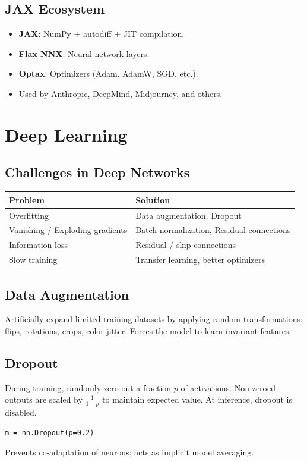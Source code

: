 \documentclass[11pt]{article}
\begin{document}
\subsection{JAX Ecosystem}
\begin{itemize}
  \item \textbf{JAX}: NumPy + autodiff + JIT compilation.
  \item \textbf{Flax NNX}: Neural network layers.
  \item \textbf{Optax}: Optimizers (Adam, AdamW, SGD, etc.).
  \item Used by Anthropic, DeepMind, Midjourney, and others.
\end{itemize}

\section{Deep Learning}

\subsection{Challenges in Deep Networks}
\begin{center}
\begin{tabular}{ll}
  \toprule
  Problem & Solution \\
  \midrule
  Overfitting & Data augmentation, Dropout \\
  Vanishing / Exploding gradients & Batch normalization, Residual connections \\
  Information loss & Residual / skip connections \\
  Slow training & Transfer learning, better optimizers \\
  \bottomrule
\end{tabular}
\end{center}

\subsection{Data Augmentation}
Artificially expand limited training datasets by applying random transformations: flips, rotations, crops, color jitter. Forces the model to learn invariant features.

\subsection{Dropout}
During training, randomly zero out a fraction $p$ of activations. Non-zeroed outputs are scaled by $\frac{1}{1-p}$ to maintain expected value. At inference, dropout is disabled.
\begin{lstlisting}
m = nn.Dropout(p=0.2)
\end{lstlisting}
Prevents co-adaptation of neurons; acts as implicit model averaging.
\end{document}
